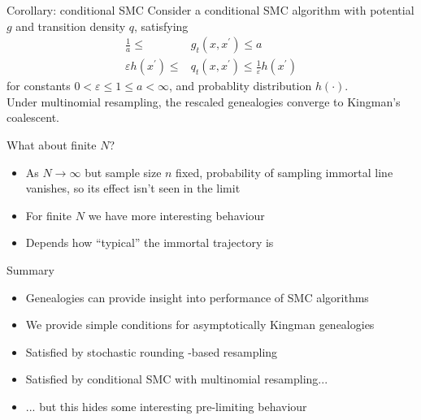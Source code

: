 \documentclass[aspectratio=169]{beamer}
\theoremstyle{definition}
\begin{document}
\begin{frame}{Corollary: conditional SMC}
Consider a conditional SMC algorithm with potential $g$ and transition density $q$, satisfying
\begin{align*}
\frac{1}{a} \leq &g_t(x, x^\prime) \leq a \\
\varepsilon h(x^\prime) \leq &q_t(x, x^\prime) \leq \frac{1}{\varepsilon} h(x^\prime) 
\end{align*}
for constants $0<\varepsilon\leq 1\leq a<\infty$, and probablity distribution $h(\cdot)$.\\[10pt]

Under multinomial resampling, the rescaled genealogies converge to Kingman's coalescent.
\end{frame}

\begin{frame}{What about finite $N$?}
\begin{itemize}
\item As $N\to\infty$ but sample size $n$ fixed, probability of sampling immortal line vanishes, so its effect isn't seen in the limit
\pause
\item For finite $N$ we have more interesting behaviour
\item Depends how ``typical'' the immortal trajectory is 
\end{itemize}
\end{frame}

\begin{frame}{Summary}
\begin{itemize}
\item Genealogies can provide insight into performance of SMC algorithms
\item We provide simple conditions for asymptotically Kingman genealogies
\item Satisfied by stochastic rounding -based resampling
\item Satisfied by conditional SMC with multinomial resampling...
\item ... but this hides some interesting pre-limiting behaviour
\end{itemize}
\end{frame}
\end{document}
